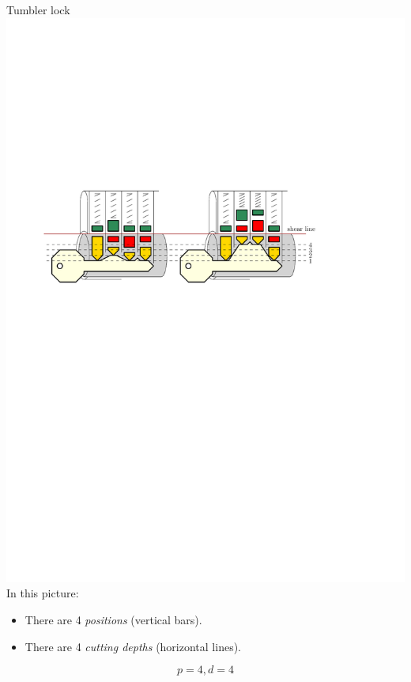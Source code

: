 \begin{frame}{Tumbler lock}
  \includegraphics[width=\textwidth]{TumblerLock.pdf}
  \pause
  In this picture:
  \begin{itemize}
    \item There are 4 \emph{positions} (vertical bars).
    \item There are 4 \emph{cutting depths} (horizontal lines).
  \end{itemize}
  $$p=4, d=4$$
\end{frame}

